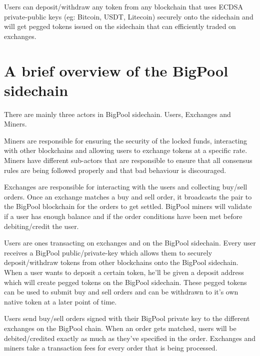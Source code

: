 \documentclass{Bigpool}
\begin{document}
Users can deposit/withdraw any token from any blockchain that uses ECDSA private-public keys (eg: Bitcoin, USDT, Litecoin) securely onto the sidechain and will get pegged tokens issued on the sidechain that can efficiently traded on exchanges.

\newpage

\section{A brief overview of the BigPool sidechain}
There are mainly three actors in BigPool sidechain. Users, Exchanges and Miners.

Miners are responsible for ensuring the security of the locked funds, interacting with other blockchains and allowing users to exchange tokens at a specific rate. Miners have different sub-actors that are responsible to ensure that all consensus rules are being followed properly and that bad behaviour is discouraged. 

Exchanges are responsible for interacting with the users and collecting buy/sell orders. Once an exchange matches a buy and sell order, it broadcasts the pair to the BigPool blockchain for the orders to get settled. BigPool miners will validate if a user has enough balance and if the order conditions have been met before debiting/credit the user.

Users are ones transacting on exchanges and on the BigPool sidechain. Every user receives a BigPool public/private-key which allows them to securely deposit/withdraw tokens from other blockchains onto the BigPool sidechain. When a user wants to deposit a certain token, he'll be given a deposit address which will create pegged tokens on the BigPool sidechain. These pegged tokens can be used to submit buy and sell orders and can be withdrawn to it's own native token at a later point of time.

Users send buy/sell orders signed with their BigPool private key to the different exchanges on the BigPool chain. When an order gets matched, users will be debited/credited exactly as much as they've specified in the order. Exchanges and miners take a transaction fees for every order that is being processed.


\end{document}
